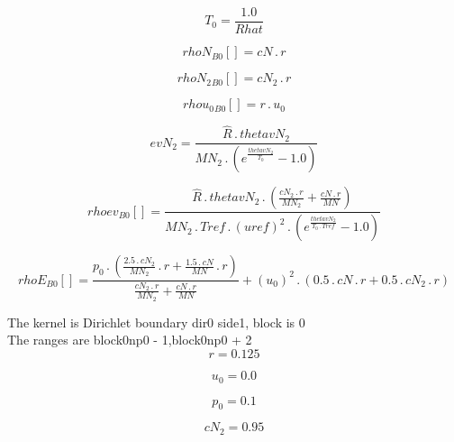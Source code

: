 \documentclass{article}
\begin{document}
\begin{dmath}T_{0} = \frac{1.0}{Rhat}\end{dmath}

\begin{dmath}{rhoN{_{B0}}}[{}] = cN \,.\, r\end{dmath}

\begin{dmath}{rhoN_{2}{_{B0}}}[{}] = cN_{2} \,.\, r\end{dmath}

\begin{dmath}{rhou_{0}{_{B0}}}[{}] = r \,.\, u_{0}\end{dmath}

\begin{dmath}evN_{2} = \frac{\hat{R} \,.\, thetavN_{2}}{MN_{2} \,.\, \left(e^{\frac{thetavN_{2}}{T_{0}}} - 1.0\right)}\end{dmath}

\begin{dmath}{rhoev{_{B0}}}[{}] = \frac{\hat{R} \,.\, thetavN_{2} \,.\, \left(\frac{cN_{2} \,.\, r}{MN_{2}} + \frac{cN \,.\, r}{MN}\right)}{MN_{2} \,.\, Tref \,.\, \left(uref \right)^{2} \,.\, \left(e^{\frac{thetavN_{2}}{T_{0} \,.\, Tref}} - 
1.0\right)}\end{dmath}

\begin{dmath}{rhoE{_{B0}}}[{}] = \frac{p_{0} \,.\, \left(\frac{2.5 \,.\, cN_{2}}{MN_{2}} \,.\, r + \frac{1.5 \,.\, cN}{MN} \,.\, r\right)}{\frac{cN_{2} \,.\, r}{MN_{2}} + \frac{cN \,.\, r}{MN}} + \left(u_{0} \right)^{2} \,.\, \left(0.5 \,.\, cN \,.\, 
r + 0.5 \,.\, cN_{2} \,.\, r\right)\end{dmath}

\noindent The kernel is Dirichlet boundary dir0 side1, block is 0\\\noindent The ranges are block0np0 - 1,block0np0 + 2\\\begin{dmath}r = 0.125\end{dmath}

\begin{dmath}u_{0} = 0.0\end{dmath}

\begin{dmath}p_{0} = 0.1\end{dmath}

\begin{dmath}cN_{2} = 0.95\end{dmath}
\end{document}

